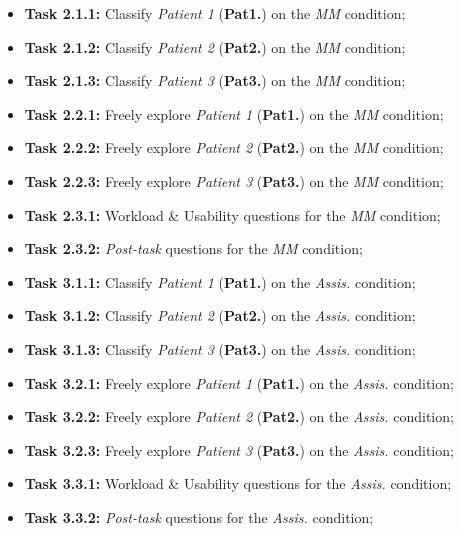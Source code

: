 \hfill

\begin{itemize}
\item[] \textbf{Task 2.1.1:} Classify \textit{Patient 1} ({\bf Pat1.}) on the {\it \gls{MM}} condition;
\item[] \textbf{Task 2.1.2:} Classify \textit{Patient 2} ({\bf Pat2.}) on the {\it \gls{MM}} condition;
\item[] \textbf{Task 2.1.3:} Classify \textit{Patient 3} ({\bf Pat3.}) on the {\it \gls{MM}} condition;
\end{itemize}

\hfill

\begin{itemize}
\item[] \textbf{Task 2.2.1:} Freely explore \textit{Patient 1} ({\bf Pat1.}) on the {\it \gls{MM}} condition;
\item[] \textbf{Task 2.2.2:} Freely explore \textit{Patient 2} ({\bf Pat2.}) on the {\it \gls{MM}} condition;
\item[] \textbf{Task 2.2.3:} Freely explore \textit{Patient 3} ({\bf Pat3.}) on the {\it \gls{MM}} condition;
\end{itemize}

\hfill

\begin{itemize}
\item[] \textbf{Task 2.3.1:} Workload \& Usability questions for the {\it \gls{MM}} condition;
\item[] \textbf{Task 2.3.2:} {\it Post-task} questions for the {\it \gls{MM}} condition;
\end{itemize}

\hfill

\begin{itemize}
\item[] \textbf{Task 3.1.1:} Classify \textit{Patient 1} ({\bf Pat1.}) on the \textit{Assis.} condition;
\item[] \textbf{Task 3.1.2:} Classify \textit{Patient 2} ({\bf Pat2.}) on the \textit{Assis.} condition;
\item[] \textbf{Task 3.1.3:} Classify \textit{Patient 3} ({\bf Pat3.}) on the \textit{Assis.} condition;
\end{itemize}

\hfill

\begin{itemize}
\item[] \textbf{Task 3.2.1:} Freely explore \textit{Patient 1} ({\bf Pat1.}) on the \textit{Assis.} condition;
\item[] \textbf{Task 3.2.2:} Freely explore \textit{Patient 2} ({\bf Pat2.}) on the \textit{Assis.} condition;
\item[] \textbf{Task 3.2.3:} Freely explore \textit{Patient 3} ({\bf Pat3.}) on the \textit{Assis.} condition;
\end{itemize}

\hfill

\begin{itemize}
\item[] \textbf{Task 3.3.1:} Workload \& Usability questions for the \textit{Assis.} condition;
\item[] \textbf{Task 3.3.2:} {\it Post-task} questions for the \textit{Assis.} condition;
\end{itemize}

\hfill

